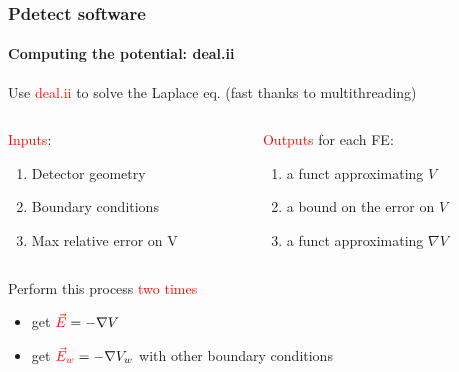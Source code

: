 \documentclass[14pt]{beamer}
\begin{document}
\begin{frame}
  \frametitle{Pdetect software}
  \framesubtitle{Computing the potential: deal.ii}

\fontsize{13pt}{7.2}\selectfont

Use \textcolor{red}{deal.ii} to solve the Laplace eq. (fast thanks to multithreading)
\newline

\vspace{1.5em}

\begin{columns}
  \begin{column}{0.5\textwidth}

    \textcolor{red}{Inputs}:
      \begin{enumerate}
        \item Detector geometry
        \item Boundary conditions
        \item Max relative error on V
      \end{enumerate}

  \end{column}

  \begin{column}{0.6\textwidth}
    \textcolor{red}{Outputs} for each FE:
    \begin{enumerate}
      \item a funct approximating $V$
      \item a bound on the error on $V$
      \item a funct approximating $\nabla V$
    \end{enumerate}

  \end{column}
\end{columns}

\vspace{2em}

Perform this process \textcolor{red}{two times}
\begin{itemize}
  \item get $\textcolor{red}{\vec{E}} = -\nabla V$
  \item get $\textcolor{red}{\vec{E}_w} = -\nabla V_w$ with other boundary conditions
\end{itemize}
\end{frame}
\end{document}
